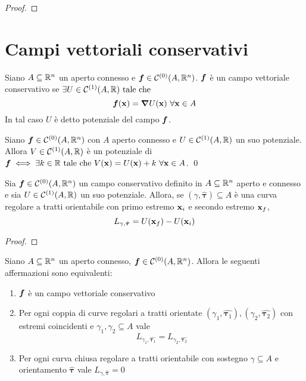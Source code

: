 \begin{proof}
\end{proof}

\section{Campi vettoriali conservativi}

\begin{definition}
	Siano $A \subseteq \mathbb{R}^n$ un aperto connesso e $\bm f \in \mathcal{C}^{(0)}(A,\mathbb{R}^n)$. $\bm f$ è un campo vettoriale conservativo se $\exists U \in \mathcal{C}^{(1)}(A,\mathbb{R}) \text{ tale che }$
	$$
		\vecf(\vb{x})=\grad U(\vb{x}) \ \forall \vb{x} \in A
	$$
	In tal caso $U$ è detto potenziale del campo $\bm f$.
\end{definition}

\begin{prop}
	Siano $\bm f \in \mathcal{C}^{(0)}(A,\mathbb{R}^n)$ con $A$ aperto connesso e $U \in \mathcal{C}^{(1)}(A,\mathbb{R})$ un suo potenziale. Allora $V\in \mathcal{C}^{(1)}(A,\mathbb{R})$ è un potenziale di $\bm f \iff \exists k \in \mathbb{R} \text{ tale che } V(\vb{x})=U(\vb{x}) + k \ \forall \vb{x} \in A$.
	\qed
\end{prop}

\begin{theorem}
	Sia $\bm f \in \mathcal{C}^{(0)}(A,\mathbb{R}^n)$ un campo conservativo definito in $A\subseteq\mathbb{R}^n$ aperto e connesso e sia $U \in \mathcal{C}^{(1)}(A,\mathbb{R})$ un suo potenziale. Allora, se $(\gamma,\hat{\bm\tau}) \subseteq A$ è una curva regolare a tratti orientabile con primo estremo $\vb{x}_i$ e secondo estremo $\vb{x}_f$,
	$$
		L_{\gamma, \hat{\bm\tau}}=U(\vb{x}_f)-U(\vb{x}_i)
	$$
\end{theorem}

\begin{proof}
\end{proof}

\begin{theorem}
	Siano $A\subseteq\mathbb{R}^n$ un aperto connesso, $\bm f \in \mathcal{C}^{(0)}(A,\mathbb{R}^n)$. Allora le seguenti affermazioni sono equivalenti:
	\begin{enumerate}
		\item $\bm f$ è un campo vettoriale conservativo
		\item Per ogni coppia di curve regolari a tratti orientate $(\gamma_1,\hat{\bm\tau_1}), (\gamma_2,\hat{\bm\tau_2})$ con estremi coincidenti e $\gamma_1,\gamma_2 \subseteq A$ vale
		$$
			L_{\gamma_1,\hat{\bm\tau_1}}=L_{\gamma_2,\hat{\bm\tau_2}}
		$$
		\item Per ogni curva chiusa regolare a tratti orientabile con sostegno $\gamma \subseteq A$ e orientamento $\hat{\bm\tau}$ vale $L_{\gamma, \hat{\bm\tau}}=0$
	\end{enumerate}
\end{theorem}

